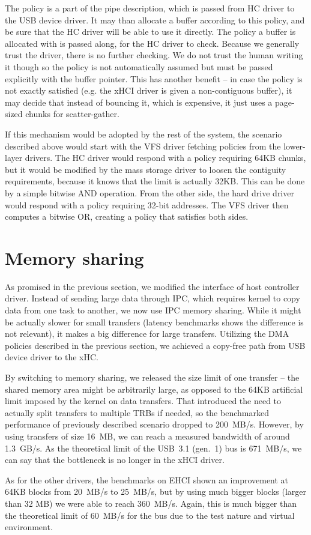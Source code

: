 The policy is a part of the pipe description, which is passed from HC driver to
the USB device driver. It may than allocate a buffer according to this
policy, and be sure that the HC driver will be able to use it directly. The
policy a buffer is allocated with is passed along, for the HC driver to check.
Because we generally trust the driver, there is no further checking. We do not
trust the human writing it though so the policy is not automatically assumed
but must be passed explicitly with the buffer pointer. This has another benefit
-- in case the policy is not exactly satisfied (e.g. the xHCI driver is given
a non-contiguous buffer), it may decide that instead of bouncing it, which is
expensive, it just uses a page-sized chunks for scatter-gather.

If this mechanism would be adopted by the rest of the system, the scenario
described above would start with the VFS driver fetching policies from the
lower-layer drivers. The HC driver would respond with a policy requiring 64KB
chunks, but it would be modified by the mass storage driver to loosen the
contiguity requirements, because it knows that the limit is actually 32KB. This
can be done by a simple bitwise AND operation. From the other side, the hard
drive driver would respond with a policy requiring 32-bit addresses. The VFS
driver then computes a bitwise OR, creating a policy that satisfies both sides.

\section{Memory sharing}

As promised in the previous section, we modified the interface of host
controller driver. Instead of sending large data through IPC, which requires
kernel to copy data from one task to another, we now use IPC memory sharing.
While it might be actually slower for small transfers (latency benchmarks shows
the difference is not relevant), it makes a big difference for large transfers.
Utilizing the DMA policies described in the previous section, we achieved
a copy-free path from USB device driver to the xHC.

By switching to memory sharing, we released the size limit of one transfer --
the shared memory area might be arbitrarily large, as opposed to the 64KB
artificial limit imposed by the kernel on data transfers. That introduced the
need to actually split transfers to multiple TRBs if needed, so the benchmarked
performance of previously described scenario dropped to 200~MB/s. However, by
using transfers of size 16~MB, we can reach a measured bandwidth of around 1.3~GB/s.
As the theoretical limit of the USB~3.1 (gen.~1) bus is 671~MB/s, we can say that the
bottleneck is no longer in the xHCI driver.

As for the other drivers, the benchmarks on EHCI shown an improvement at 64KB
blocks from 20~MB/s to 25~MB/s, but by using much bigger blocks (larger than 32
MB) we were able to reach 360~MB/s. Again, this is much bigger than the
theoretical limit of 60~MB/s for the bus due to the test nature and virtual
environment.
